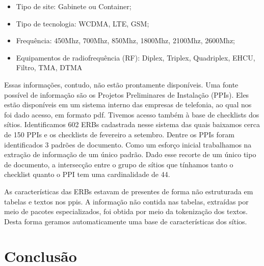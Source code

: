 \documentclass[
	12pt,				%
	openany,			%
	oneside,			%
	a4paper,			%
	english,			%
	french,				%
	spanish,			%
	brazil,				%
	]{abntex2}
\begin{document}
\begin{itemize}
\item Tipo de site: Gabinete ou Container;
\item Tipo de tecnologia: WCDMA, LTE, GSM;
\item Frequência: 450Mhz, 700Mhz, 850Mhz, 1800Mhz,  2100Mhz, 2600Mhz;
\item Equipamentos de radiofrequência (RF): Diplex, Triplex, Quadriplex, EHCU, Filtro, TMA, DTMA
\end{itemize}

Essas informações, contudo, não estão prontamente disponíveis. Uma fonte
possível de informação são os Projetos Preliminares de Instalação (PPIs). Eles
estão disponíveis em um sistema interno das empresas de telefonia, ao qual nos
foi dado acesso, em formato pdf. Tivemos acesso também à base de checklists dos
sítios. Identificamos 602 ERBs cadastrada nesse sistema das quais baixamos cerca
de 150 PPIs e os checklists de fevereiro a setembro. Dentre os PPIs foram
identificados 3 padrões de documento. Como um esforço inicial trabalhamos na
extração de informação de um único padrão. Dado esse recorte de um único tipo de
documento, a intersecção entre o grupo de sítios que tínhamos tanto o checklist
quanto o PPI tem uma cardinalidade de 44.

As características das ERBs estavam de presentes de forma não estruturada em
tabelas e textos nos ppis. A informação não contida nas tabelas, extraídas por
meio de pacotes especializados, foi obtida por meio da tokenização dos textos.
Desta forma geramos automaticamente uma base de características dos sítios.



\chapter*[Conclusão]{Conclusão}


\postextual



%
%


\printindex
\end{document}
